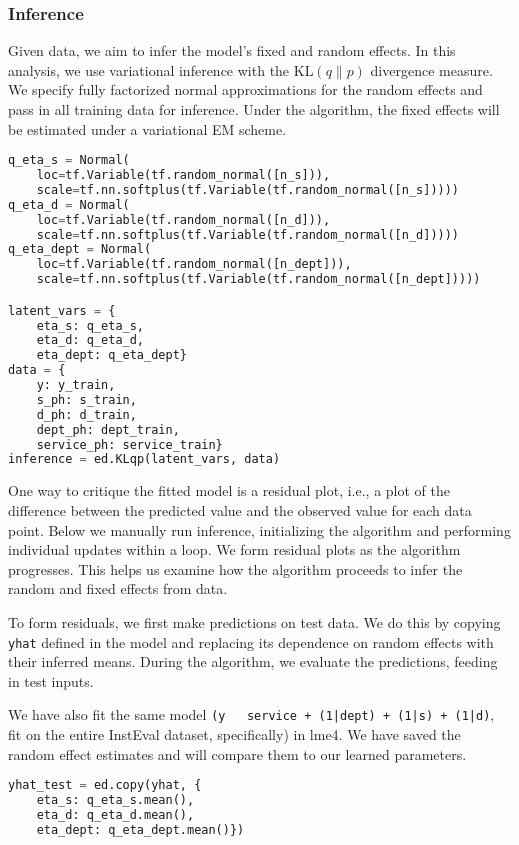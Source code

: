 \subsubsection{Inference}

Given data, we aim to infer the model's fixed and random effects.
In this analysis, we use variational inference with the
$\text{KL}(q\|p)$ divergence measure. We specify fully factorized
normal approximations for the random effects and pass in all training
data for inference. Under the algorithm, the fixed effects will be
estimated under a variational EM scheme.

\begin{lstlisting}[language=Python]
q_eta_s = Normal(
    loc=tf.Variable(tf.random_normal([n_s])),
    scale=tf.nn.softplus(tf.Variable(tf.random_normal([n_s]))))
q_eta_d = Normal(
    loc=tf.Variable(tf.random_normal([n_d])),
    scale=tf.nn.softplus(tf.Variable(tf.random_normal([n_d]))))
q_eta_dept = Normal(
    loc=tf.Variable(tf.random_normal([n_dept])),
    scale=tf.nn.softplus(tf.Variable(tf.random_normal([n_dept]))))

latent_vars = {
    eta_s: q_eta_s,
    eta_d: q_eta_d,
    eta_dept: q_eta_dept}
data = {
    y: y_train,
    s_ph: s_train,
    d_ph: d_train,
    dept_ph: dept_train,
    service_ph: service_train}
inference = ed.KLqp(latent_vars, data)
\end{lstlisting}

One way to critique the fitted model is a residual plot, i.e., a
plot of the difference between the predicted value and the observed
value for each data point. Below we manually run inference,
initializing the algorithm and performing individual updates within a
loop. We form residual plots as the algorithm progresses. This helps
us examine how the algorithm proceeds to infer the random and fixed
effects from data.

To form residuals, we first make predictions on test data. We do this
by copying \texttt{yhat} defined in the model and replacing its
dependence on random effects with their inferred means. During the
algorithm, we evaluate the predictions, feeding in test inputs.

We have also fit the same model
\texttt{(y ~ service + (1|dept) + (1|s) + (1|d)},
fit on the entire InstEval dataset, specifically) in lme4. We
have saved the random effect estimates and will compare them to our
learned parameters.

\begin{lstlisting}[language=Python]
yhat_test = ed.copy(yhat, {
    eta_s: q_eta_s.mean(),
    eta_d: q_eta_d.mean(),
    eta_dept: q_eta_dept.mean()})
\end{lstlisting}

